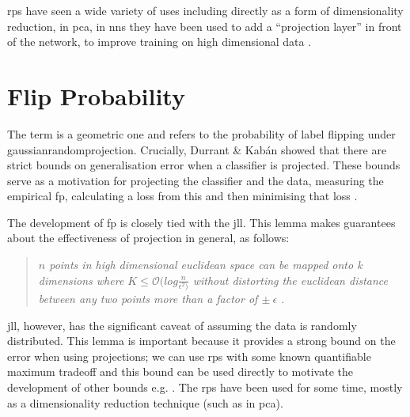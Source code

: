\gls{rp}s have seen a wide variety of uses including directly as a form of dimensionality reduction, in \gls{pca}, in \gls{nn}s they have been used to add a \enquote{projection layer} in front of the network, to improve training on high dimensional data \cite{random_project_high_d}.


\section{Flip Probability}

The term  is a geometric one and refers to the probability of label flipping under \gls{gaussianrandomprojection}. Crucially, Durrant \& Kab\'an showed that there are strict bounds on generalisation error when a classifier is projected. These bounds serve as a motivation for projecting the classifier and the data, measuring the empirical \gls{fp}, calculating a loss from this and then minimising that loss \cite{bob_sharp_generalisation_error_bounds}.
\bigskip 

The development of \gls{fp} is closely tied with the \gls{jll}. This lemma makes guarantees about the effectiveness of projection in general, as follows:

\begin{quote}
    \textit{$n$ points in high dimensional euclidean space can be mapped onto k dimensions where $K \leq \mathcal{O}(log \frac{n}{\epsilon^{2})} $ without distorting the euclidean distance between any two points more than a factor of $\pm \: \epsilon$ \cite{jll_notes}.}
\end{quote}

\Gls{jll}, however, has the significant caveat of assuming the data is randomly distributed. This lemma is important because it provides a strong bound on the error when using projections; we can use \gls{rp}s with some known quantifiable maximum tradeoff and this bound can be used directly to motivate the development of other bounds e.g. \cite{bob_sharp_generalisation_error_bounds}.  The \gls{rp}s have been used for some time, mostly as a dimensionality reduction technique (such as in \gls{pca}).
\bigskip



